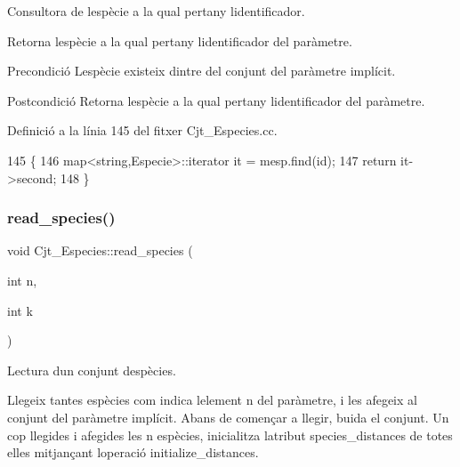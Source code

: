 Consultora de l\textquotesingle{}espècie a la qual pertany l\textquotesingle{}identificador. 

Retorna l\textquotesingle{}espècie a la qual pertany l\textquotesingle{}identificador del paràmetre.

\begin{DoxyPrecond}{Precondició}
L\textquotesingle{}espècie existeix dintre del conjunt del paràmetre implícit. 
\end{DoxyPrecond}
\begin{DoxyPostcond}{Postcondició}
Retorna l\textquotesingle{}espècie a la qual pertany l\textquotesingle{}identificador del paràmetre. 
\end{DoxyPostcond}


Definició a la línia 145 del fitxer Cjt\+\_\+\+Especies.\+cc.


\begin{DoxyCode}
145                                             \{
146     map<string,Especie>::iterator it = mesp.find(\textcolor{keywordtype}{id});
147     \textcolor{keywordflow}{return} it->second;
148 \}
\end{DoxyCode}
\mbox{\label{class_cjt___especies_a273156c50e67be8815bdd1c31cc1661a}} 
\subsubsection{\texorpdfstring{read\+\_\+species()}{read\_species()}}
{\footnotesize\ttfamily void Cjt\+\_\+\+Especies\+::read\+\_\+species (\begin{DoxyParamCaption}\item[{int}]{n,  }\item[{int}]{k }\end{DoxyParamCaption})}



Lectura d\textquotesingle{}un conjunt d\textquotesingle{}espècies. 

Llegeix tantes espècies com indica l\textquotesingle{}element n del paràmetre, i les afegeix al conjunt del paràmetre implícit. Abans de començar a llegir, buida el conjunt. Un cop llegides i afegides les n espècies, inicialitza l\textquotesingle{}atribut species\+\_\+distances de totes elles mitjançant l\textquotesingle{}operació initialize\+\_\+distances.

